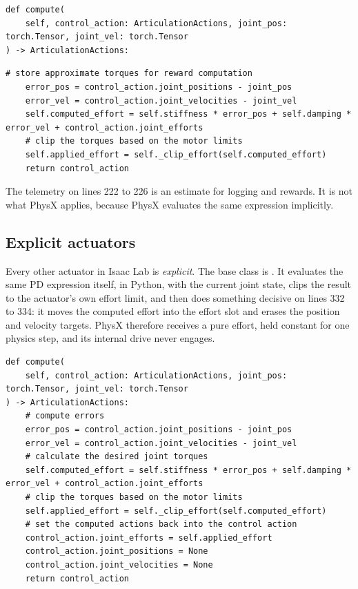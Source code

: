\begin{snippetbox}[11]
\begin{lstlisting}[firstnumber=199]
def compute(
    self, control_action: ArticulationActions, joint_pos: torch.Tensor, joint_vel: torch.Tensor
) -> ArticulationActions:
\end{lstlisting}
\snippetelide
\begin{lstlisting}[firstnumber=221]
    # store approximate torques for reward computation
    error_pos = control_action.joint_positions - joint_pos
    error_vel = control_action.joint_velocities - joint_vel
    self.computed_effort = self.stiffness * error_pos + self.damping * error_vel + control_action.joint_efforts
    # clip the torques based on the motor limits
    self.applied_effort = self._clip_effort(self.computed_effort)
    return control_action
\end{lstlisting}
\end{snippetbox}

The telemetry on lines 222 to 226 is an estimate for logging and rewards. It is not what PhysX applies, because PhysX evaluates the same expression implicitly.

\subsection{Explicit actuators}

Every other actuator in Isaac Lab is \emph{explicit}. The base class is . It evaluates the same PD expression itself, in Python, with the current joint state, clips the result to the actuator's own effort limit, and then does something decisive on lines 332 to 334: it moves the computed effort into the effort slot and erases the position and velocity targets. PhysX therefore receives a pure effort, held constant for one physics step, and its internal drive never engages.

\begin{snippetbox}[11]
\begin{lstlisting}[firstnumber=321]
def compute(
    self, control_action: ArticulationActions, joint_pos: torch.Tensor, joint_vel: torch.Tensor
) -> ArticulationActions:
    # compute errors
    error_pos = control_action.joint_positions - joint_pos
    error_vel = control_action.joint_velocities - joint_vel
    # calculate the desired joint torques
    self.computed_effort = self.stiffness * error_pos + self.damping * error_vel + control_action.joint_efforts
    # clip the torques based on the motor limits
    self.applied_effort = self._clip_effort(self.computed_effort)
    # set the computed actions back into the control action
    control_action.joint_efforts = self.applied_effort
    control_action.joint_positions = None
    control_action.joint_velocities = None
    return control_action
\end{lstlisting}
\end{snippetbox}

